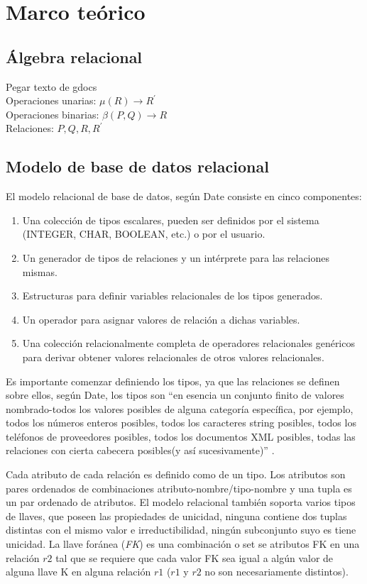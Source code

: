 \documentclass[letterpaper]{article}
\begin{document}
\section {Marco teórico}
\subsection {Álgebra relacional}
Pegar texto de gdocs\\
Operaciones unarias: $\mu(R) \rightarrow R^\prime$\\
Operaciones binarias: $\beta(P,Q) \rightarrow R$\\
Relaciones: $P,Q,R,R^\prime$

\subsection {Modelo de base de datos relacional}
El modelo relacional de base de datos, según Date \cite{date12} consiste en cinco componentes:
\begin{enumerate}
    \item Una colección de tipos escalares, pueden ser definidos por el sistema (INTEGER, CHAR, BOOLEAN, etc.) o por el usuario.
    \item Un generador de tipos de relaciones y un intérprete para las relaciones mismas.
    \item Estructuras para definir variables relacionales de los tipos generados.
    \item Un operador para asignar valores de relación a dichas variables.
    \item Una colección relacionalmente completa de operadores relacionales genéricos para derivar obtener valores relacionales de otros valores relacionales.
\end{enumerate}
Es importante comenzar definiendo los tipos, ya que las relaciones se definen sobre ellos, según Date, los tipos son ``en esencia un conjunto finito de valores nombrado-todos los valores posibles de alguna categoría específica, por ejemplo, todos los números enteros posibles, todos los caracteres string posibles, todos los teléfonos de proveedores posibles, todos los documentos XML posibles, todas las relaciones con cierta cabecera posibles(y así sucesivamente)'' \cite{date12}.

Cada atributo de cada relación es definido como de un tipo. Los atributos son pares ordenados de combinaciones atributo-nombre/tipo-nombre y una tupla es un par ordenado de atributos.
El modelo relacional también soporta varios tipos de llaves, que poseen las propiedades de unicidad, ninguna contiene dos tuplas distintas con el mismo valor e irreductibilidad, ningún subconjunto suyo es tiene unicidad. La llave foránea (\emph{FK}) es una combinación o set se atributos FK en una relación $r2$ tal que se requiere que cada valor FK sea igual a algún valor de alguna llave K en alguna relación $r1$ ($r1$ y $r2$ no son necesariamente distintos).
\end{document}
